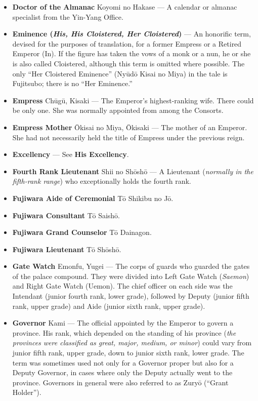 \documentclass{article}
\begin{document}
\begin{multicols}{2}
\begin{small}
\begin{itemize}[
				label=,
				leftmargin=0em,
				rightmargin=-1.5em,
				itemindent=-2em,
			]
			\item \textbf{Doctor of the Almanac} Koyomi no Hakase --- A calendar or almanac specialist from the Yin-Yang Office.

			\item \textbf{Eminence (\textit{His, His Cloistered, Her Cloistered})} --- An honorific term, devised for the purposes of translation, for a former Empress or a Retired Emperor (In). If the figure has taken the vows of a monk or a nun, he or she is also called Cloistered, although this term is omitted where possible. The only “Her Cloistered Eminence” (Nyūdō Kisai no Miya) in the tale is Fujitsubo; there is no “Her Eminence.”

			\item \textbf{Empress} Chūgū, Kisaki --- The Emperor's highest-ranking wife. There could be only one. She was normally appointed from among the Consorts.

			\item \textbf{Empress Mother} Ōkisai no Miya, Ōkisaki --- The mother of an Emperor. She had not necessarily held the title of Empress under the previous reign.

			\item \textbf{Excellency} --- See \textbf{His Excellency}.

			\item \textbf{Fourth Rank Lieutenant} Shii no Shōshō --- A Lieutenant (\textit{normally in the fifth-rank range}) who exceptionally holds the fourth rank.

			\item \textbf{Fujiwara Aide of Ceremonial} Tō Shikibu no Jō.

			\item \textbf{Fujiwara Consultant} Tō Saishō.

			\item \textbf{Fujiwara Grand Counselor} Tō Dainagon.

			\item \textbf{Fujiwara Lieutenant} Tō Shōshō.

			\item \textbf{Gate Watch} Emonfu, Yugei --- The corps of guards who guarded the gates of the palace compound. They were divided into Left Gate Watch (\textit{Saemon}) and Right Gate Watch (Uemon). The chief officer on each side was the Intendant (junior fourth rank, lower grade), followed by Deputy (junior fifth rank, upper grade) and Aide (junior sixth rank, upper grade).

			\item \textbf{Governor} Kami --- The official appointed by the Emperor to govern a province. His rank, which depended on the standing of his province (\textit{the provinces were classified as great, major, medium, or minor}) could vary from junior fifth rank, upper grade, down to junior sixth rank, lower grade. The term was sometimes used not only for a Governor proper but also for a Deputy Governor, in cases where only the Deputy actually went to the province. Governors in general were also referred to as Zuryō (“Grant Holder”).


\end{itemize}
\end{small}
\end{multicols}
\end{document}

